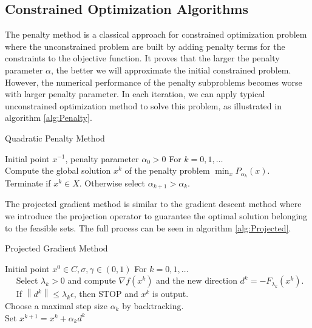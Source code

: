 \subsection{Constrained Optimization Algorithms}
The penalty method is a classical approach for constrained optimization problem where the unconstrained problem are built by adding penalty terms for the constraints to the objective function. It proves that the larger the penalty parameter $\alpha$, the better we will approximate the initial constrained problem. However, the numerical performance of the penalty subproblems becomes worse with larger penalty parameter. In each iteration, we can apply typical unconstrained optimization method to solve this problem, as illustrated in algorithm \ref{alg:Penalty}.
\begin{algorithm}[H]
  \caption{Quadratic Penalty Method}
  \label{alg:Penalty}
  \begin{algorithmic}[1]
  \REQUIRE
  Initial point $x^{-1}$, penalty parameter $\alpha_{0}>0$
  \STATE For $k=0,1, \ldots$ \\
  \STATE Compute the global solution $x^{k}$ of the penalty problem $\min _{x} P_{\alpha_{k}}(x)$. \\     
  \ENSURE Terminate if $x^{k} \in X$. Otherwise select $\alpha_{k+1}>\alpha_{k}$.  
 \end{algorithmic}
 \end{algorithm} 

The projected gradient method is similar to the gradient descent method where we introduce the projection operator to guarantee the optimal solution belonging to the feasible sets. The full process can be seen in 
algorithm \ref{alg:Projected}.
 \begin{algorithm}[H]
  \caption{Projected Gradient Method}
  \label{alg:Projected}
  \begin{algorithmic}[1]
  \REQUIRE
  Initial point $x^{0} \in C, \sigma, \gamma \in(0,1)$
  \STATE For $k=0,1, \ldots$ \\
  \STATE $\quad$ Select $\lambda_{k}>0$ and compute $\nabla f\left(x^{k}\right)$ and the new direction $d^{k}=-F_{\lambda_{k}}\left(x^{k}\right)$.  \\
  \STATE $\quad$ If $\left\|d^{k}\right\| \leq \lambda_{k} \epsilon$, then STOP and $x^{k}$ is output.  \\
  \STATE Choose a maximal step size $\alpha_{k}$ by backtracking. \\    
  \STATE Set $x^{k+1}=x^{k}+\alpha_{k} d^{k}$
 \end{algorithmic}
 \end{algorithm} 



